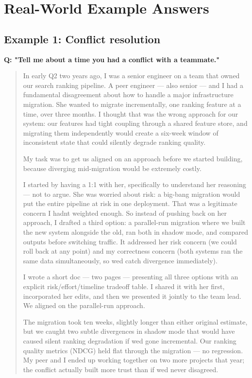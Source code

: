 \documentclass[11pt]{article}
\begin{document}
\section{Real-World Example Answers}\label{real-world-example-answers}

\subsection{Example 1: Conflict resolution}\label{example-1-conflict-resolution}

\textbf{Q: "Tell me about a time you had a conflict with a teammate."}

\begin{quote}
In early Q2 two years ago, I was a senior engineer on a team that owned our search ranking pipeline. A peer engineer --- also senior --- and I had a fundamental disagreement about how to handle a major infrastructure migration. She wanted to migrate incrementally, one ranking feature at a time, over three months. I thought that was the wrong approach for our system: our features had tight coupling through a shared feature store, and migrating them independently would create a six-week window of inconsistent state that could silently degrade ranking quality.

My task was to get us aligned on an approach before we started building, because diverging mid-migration would be extremely costly.

I started by having a 1:1 with her, specifically to understand her reasoning --- not to argue. She was worried about risk: a big-bang migration would put the entire pipeline at risk in one deployment. That was a legitimate concern I hadn\textquotesingle t weighted enough. So instead of pushing back on her approach, I drafted a third option: a parallel-run migration where we built the new system alongside the old, ran both in shadow mode, and compared outputs before switching traffic. It addressed her risk concern (we could roll back at any point) and my correctness concern (both systems ran the same data simultaneously, so we\textquotesingle d catch divergence immediately).

I wrote a short doc --- two pages --- presenting all three options with an explicit risk/effort/timeline tradeoff table. I shared it with her first, incorporated her edits, and then we presented it jointly to the team lead. We aligned on the parallel-run approach.

The migration took ten weeks, slightly longer than either original estimate, but we caught two subtle divergences in shadow mode that would have caused silent ranking degradation if we\textquotesingle d gone incremental. Our ranking quality metrics (NDCG) held flat through the migration --- no regression. My peer and I ended up working together on two more projects that year; the conflict actually built more trust than if we\textquotesingle d never disagreed.
\end{quote}
\end{document}
